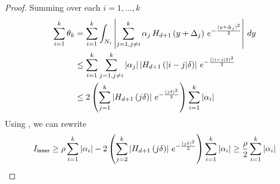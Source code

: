 \begin{proof}
    Summing over each $i = 1,\ldots,k$
    \begin{align*}
        \sum_{i=1}^k \theta_k &= \sum_{i=1}^k \int_{N_i} \left| \sum_{j=1, j \neq i}^k \alpha_j \, H_{d+1}\left( y + \Delta_j \right) \, e^{ -\frac{(y + \Delta_j)^2}{2} } \right| \, dy \\
        &\le \sum_{i=1}^k \sum_{j=1, j \neq i}^k |\alpha_j| \left|H_{d+1}\left( |i-j|\delta \right)\right| \, e^{ -\frac{(|i-j| \delta)^2}{2} }\\
        &\le 2 \left( {\sum_{j=1}^{k}  \left|H_{d+1}\left( j\delta \right) \right|\, e^{ -\frac{(j \delta)^2}{2} }} \right)  \sum_{i=1}^k |\alpha_i|
    \end{align*}
    Using , we can rewrite 
    \begin{align}
        I_{\textsf{inner}} \ge \rho \sum_{i=1}^k |\alpha_i| - 2 \left( {\sum_{j=2}^k  \left|H_{d+1}\left( j\delta \right)\right| \, e^{ -\frac{(j \delta)^2}{2} }} \right)  \sum_{i=1}^k |\alpha_i| \ge \frac{\rho}{2}\sum_{i=1}^k |\alpha_i| 
    \end{align}


\end{proof}
